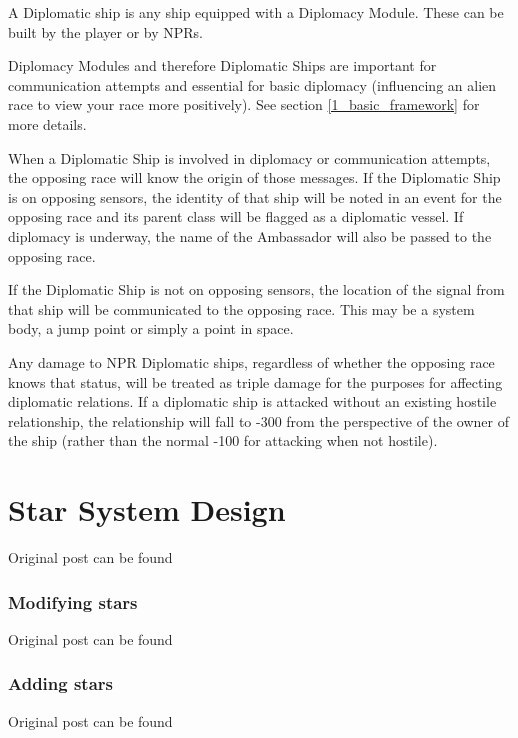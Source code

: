\documentclass[10pt,a4paper,oneside]{article}
\begin{document}
A Diplomatic ship is any ship equipped with a Diplomacy Module. These can be built by the player or by NPRs.

Diplomacy Modules and therefore Diplomatic Ships are important for communication attempts and essential for basic diplomacy (influencing an alien race to view your race more positively). See section \ref{1_basic_framework} for more details.

When a Diplomatic Ship is involved in diplomacy or communication attempts, the opposing race will know the origin of those messages. If the Diplomatic Ship is on opposing sensors, the identity of that ship will be noted in an event for the opposing race and its parent class will be flagged as a diplomatic vessel. If diplomacy is underway, the name of the Ambassador will also be passed to the opposing race.

If the Diplomatic Ship is not on opposing sensors, the location of the signal from that ship will be communicated to the opposing race. This may be a system body, a jump point or simply a point in space.

Any damage to NPR Diplomatic ships, regardless of whether the opposing race knows that status, will be treated as triple damage for the purposes for affecting diplomatic relations. If a diplomatic ship is attacked without an existing hostile relationship, the relationship will fall to -300 from the perspective of the owner of the ship (rather than the normal -100 for attacking when not hostile).


\newpage
\part{Star System Design}
Original post can be found

\section{Modifying stars}
Original post can be found

\section{Adding stars}
Original post can be found

\end{document}
